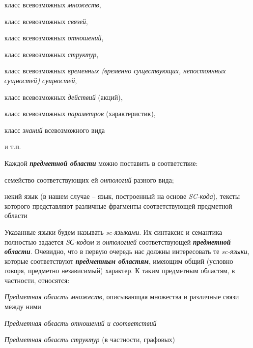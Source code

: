 \begin{SCn}
\begin{scnsubstruct}
\begin{scnsubstruct}
{\begin{scnitemize}
\begin{scnitemizeii}
                        \item класс всевозможных \textit{множеств},
                        \item класс всевозможных \textit{связей},
                        \item класс всевозможных \textit{отношений},
                        \item класс всевозможных \textit{структур},
                        \item класс всевозможных \textit{временных (временно существующих, непостоянных сущностей) сущностей},
                        \item класс всевозможных \textit{действий} (акций),
                        \item класс всевозможных \textit{параметров} (характеристик),
                        \item класс \textit{знаний} всевозможного вида
                        \item и т.п.
                    \end{scnitemizeii}
                \end{scnitemize}
                Каждой \textbf{\textit{предметной области}} можно поставить в соответствие:
                \begin{scnitemize}
                    \item семейство соответствующих ей \textit{онтологий} разного вида;
                    \item некий язык (в нашем случае -- язык, построенный на основе \textit{SC-кода}), тексты которого представляют различные фрагменты соответствующей предметной области
                \end{scnitemize}
                Указанные языки будем называть \textit{sc-языками}. Их синтаксис и семантика полностью задается \textit{SС-кодом} и \textit{онтологией} соответствующей \textbf{\textit{предметной области}}. Очевидно, что в первую очередь нас должны интересовать те \textit{sc-языки}, которые соответствуют \textbf{\textit{предметным областям}}, имеющим общий (условно говоря, предметно независимый) характер. К таким предметным областям, в частности, относятся:
                \begin{scnitemize}
                    \item \textit{Предметная область множеств}, описывающая множества и различные связи между ними
                    \item \textit{Предметная область отношений и соответствий}
                    \item \textit{Предметная область структур} (в частности, графовых)

\end{scnitemize}}
\end{scnsubstruct}
\end{scnsubstruct}
\end{SCn}
